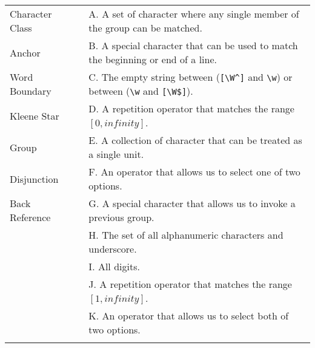 \documentclass{article}
\begin{document}
\begin{minipage}{\textwidth}
\begin{center}
\begin{tabular}{ l c l }
            \underline{\hspace{1cm}} Character Class & \hspace{0.5cm} & A. A set of character where any single member of the group can be matched. \\
            \vspace{0.2cm}
            \underline{\hspace{1cm}} Anchor & \hspace{0.5cm} & B. A special character that can be used to match the beginning or end of a line. \\
            \vspace{0.2cm}
            \underline{\hspace{1cm}} Word Boundary & \hspace{0.5cm} & C. The empty string between (\verb|[\W^]| and \verb|\w|) or between (\verb|\w| and \verb|[\W$]|). \\
            \vspace{0.2cm}
            \underline{\hspace{1cm}} Kleene Star & \hspace{0.5cm} & D. A repetition operator that matches the range $ [0, infinity] $. \\
            \vspace{0.2cm}
            \underline{\hspace{1cm}} Group & \hspace{0.5cm} & E. A collection of character that can be treated as a single unit. \\
            \vspace{0.2cm}
            \underline{\hspace{1cm}} Disjunction & \hspace{0.5cm} & F. An operator that allows us to select one of two options. \\
            \vspace{0.2cm}
            \underline{\hspace{1cm}} Back Reference & \hspace{0.5cm} & G. A special character that allows us to invoke a previous group. \\
            \vspace{0.2cm}
            & \hspace{0.5cm} & H. The set of all alphanumeric characters and underscore. \\
            \vspace{0.2cm}
            & \hspace{0.5cm} & I. All digits. \\
            \vspace{0.2cm}
            & \hspace{0.5cm} & J. A repetition operator that matches the range $ [1, infinity] $. \\
            \vspace{0.2cm}
            & \hspace{0.5cm} & K. An operator that allows us to select both of two options. \\
            \vspace{0.2cm}


\end{tabular}
\end{center}
\end{minipage}
\end{document}
